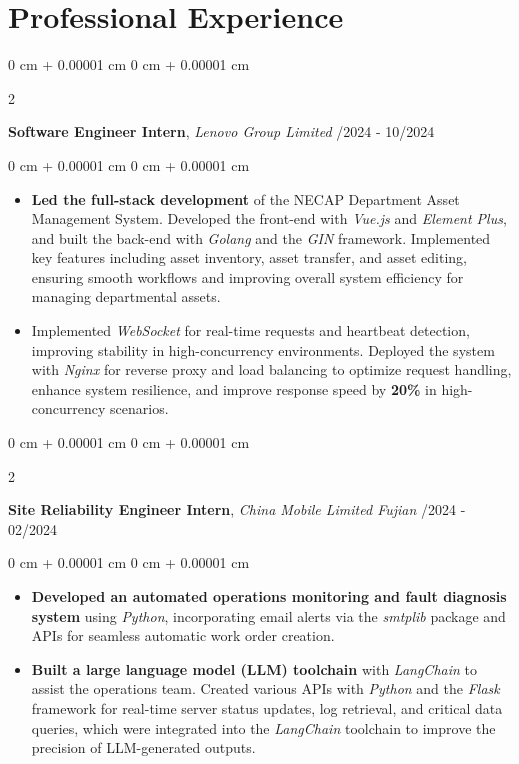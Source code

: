 \documentclass[10pt, letterpaper]{article}
\newenvironment{highlights}{
    \begin{itemize}[
        topsep=0.10 cm,
        parsep=0.10 cm,
        partopsep=0pt,
        itemsep=0pt,
        leftmargin=0 cm + 10pt
    ]
}{
    \end{itemize}
} %
\newenvironment{onecolentry}{
    \begin{adjustwidth}{
        0 cm + 0.00001 cm
    }{
        0 cm + 0.00001 cm
    }
}{
    \end{adjustwidth}
} %
\newenvironment{twocolentry}[2][]{
    \onecolentry
    \def\secondColumn{#2}
    \setcolumnwidth{\fill, 4.5 cm}
    \begin{paracol}{2}
}{
    \switchcolumn \raggedleft \secondColumn
    \end{paracol}
    \endonecolentry
} %
\begin{document}
 \section{Professional Experience}
        \begin{twocolentry}{
            07/2024 - 10/2024
        }
            \textbf{Software Engineer Intern}, \textit{Lenovo Group Limited} \end{twocolentry}

        \begin{onecolentry}
            \begin{highlights}
                \item \textbf{Led the full-stack development} of the NECAP Department Asset Management System. Developed the front-end with \textit{Vue.js} and \textit{Element Plus}, and built the back-end with \textit{Golang} and the \textit{GIN} framework. Implemented key features including asset inventory, asset transfer, and asset editing, ensuring smooth workflows and improving overall system efficiency for managing departmental assets.
               
               \item Implemented \textit{WebSocket} for real-time requests and heartbeat detection, improving stability in high-concurrency environments. Deployed the system with \textit{Nginx} for reverse proxy and load balancing to optimize request handling, enhance system resilience, and improve response speed by \textbf{20\%} in high-concurrency scenarios.
            \end{highlights}
        \end{onecolentry}


        \vspace{0.2 cm}

        \begin{twocolentry}{
            01/2024 - 02/2024
        }
            \textbf{Site Reliability Engineer Intern}, \textit{China Mobile Limited Fujian}\end{twocolentry}

        \begin{onecolentry}
            \begin{highlights}
            
                \item \textbf{Developed an automated operations monitoring and fault diagnosis system} using \textit{Python}, incorporating email alerts via the \textit{smtplib} package and APIs for seamless automatic work order creation.
                
                \item \textbf{Built a large language model (LLM) toolchain} with \textit{LangChain} to assist the operations team. Created various APIs with \textit{Python} and the \textit{Flask} framework for real-time server status updates, log retrieval, and critical data queries, which were integrated into the \textit{LangChain} toolchain to improve the precision of LLM-generated outputs.
                
            \end{highlights}
        \end{onecolentry}
\end{document}
